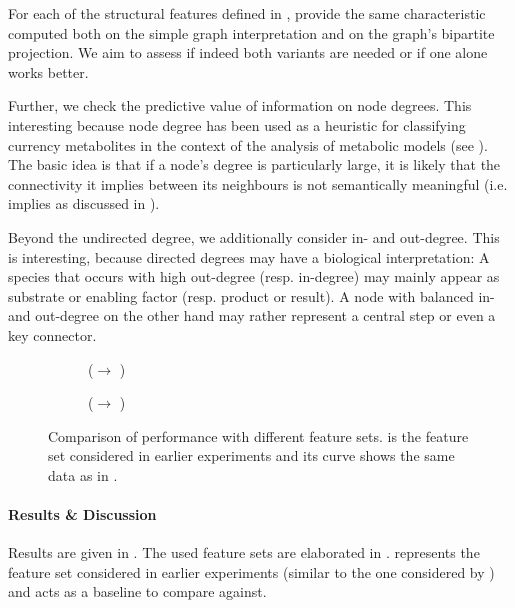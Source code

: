 \documentclass[
	fontsize=10pt, %
	twoside=false, %
	secnumdepth=1, %
  toc=indentunnumbered %
]{kaobook}
\begin{document}
For each of the structural features defined in ,
\nielsen{} provide the same characteristic computed both on the simple graph
interpretation and on the graph's bipartite projection. We aim to assess if
indeed both variants are needed or if one alone works better.

Further, we check the predictive value of information on node degrees.
This interesting because node degree has been used as a heuristic for
classifying currency metabolites in the context of the analysis of metabolic
models (see ). The basic idea is that if a node's
degree is particularly large, it is likely that the connectivity it implies
between its neighbours is not semantically meaningful (i.e. implies  as discussed in ).

Beyond the undirected degree, we additionally consider in- and out-degree. This
is interesting, because directed degrees may have a biological interpretation: A
species that occurs with high out-degree (resp. in-degree) may mainly appear as
substrate or enabling factor (resp. product or result). A node with balanced in-
and out-degree on the other hand may rather represent a central step or even a
key connector.


\begin{figure}[h]
  \centering
  \begin{subfigure}{0.48\linewidth}
    \caption{(\ADLast $\rightarrow$ \PDMap)}
  \end{subfigure}
  \begin{subfigure}{0.48\linewidth}
    \caption{(\ADLast $\rightarrow$ \ReconMap{})}
  \end{subfigure}
  \caption[Comparison of performance with different feature sets.]{Comparison of
    performance with different feature sets.  is the
    feature set considered in earlier experiments and its curve shows the same
    data as in .}
  \label{fig:feature-importance}
\end{figure}


\paragraph{Results \& Discussion} Results are given in
. The used feature sets are elaborated in
.  represents the feature set
considered in earlier experiments (similar to the one considered by \nielsen{})
and acts as a baseline to compare against.
\end{document}
